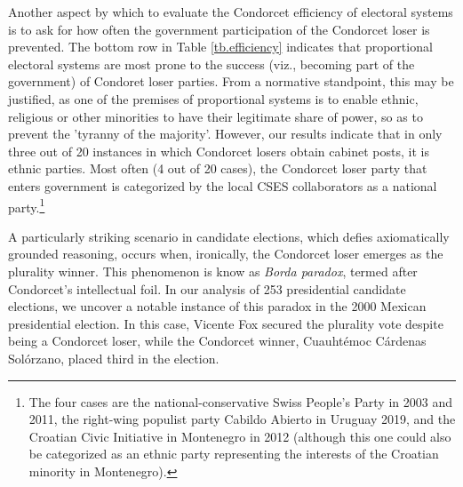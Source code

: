 \documentclass[12pt]{scrartcl}
\newcommand{\nbelections}{253 }
\begin{document}
Another aspect by which to evaluate the Condorcet efficiency of electoral systems is to ask for how often the government participation of the Condorcet loser is prevented. The bottom row in Table \ref{tb.efficiency} indicates that proportional electoral systems are most prone to the success (viz., becoming part of the government) of Condoret loser parties. From a normative standpoint, this may be justified, as one of the premises of proportional systems is to enable ethnic, religious or other minorities to have their legitimate share of power, so as to prevent the 'tyranny of the majority'. 
However, our results indicate that in only three out of 20 instances in which Condorcet losers obtain cabinet posts, it is ethnic parties. Most often (4 out of 20 cases), the Condorcet loser party that enters government is categorized by the local CSES collaborators as a national party.\footnote{
	The four cases are the national-conservative Swiss People's Party in 2003 and 2011, the right-wing populist party Cabildo Abierto in Uruguay 2019, and the Croatian Civic Initiative in Montenegro in 2012 (although this one could also be categorized as an ethnic party representing the interests of the Croatian minority in Montenegro).
} 


A particularly striking scenario in candidate elections, which defies axiomatically grounded reasoning, occurs when, ironically, the Condorcet loser emerges as the plurality winner. This phenomenon is know as \textit{Borda paradox}, termed after Condorcet's intellectual foil. In our analysis of \nbelections presidential candidate elections, we uncover a notable instance of this paradox in the 2000 Mexican presidential election. In this case, Vicente Fox secured the plurality vote despite being a Condorcet loser, while the Condorcet winner, Cuauhtémoc Cárdenas Solórzano, placed third in the election.

\end{document}

